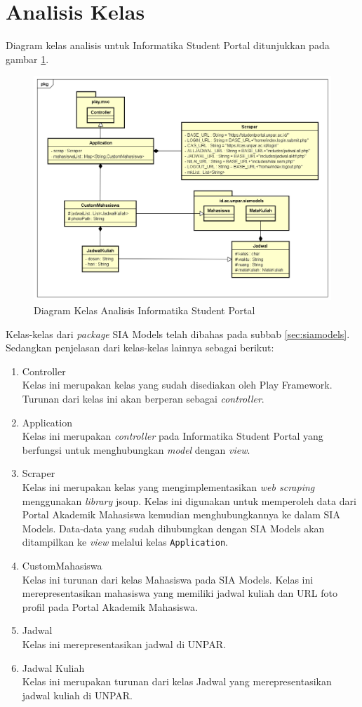\section{Analisis Kelas}
\label{sec:analisis_kelas}
Diagram kelas analisis untuk Informatika Student Portal ditunjukkan pada gambar \ref{fig:3_class_diagram}.
	\begin{figure}[H]
			\centering
			\includegraphics[scale=0.5]{Gambar/class-diagram}
			\caption{Diagram Kelas Analisis Informatika Student Portal} 
			\label{fig:3_class_diagram}
		\end{figure}
Kelas-kelas dari \textit{package} SIA Models telah dibahas pada subbab \ref{sec:siamodels}. Sedangkan penjelasan dari kelas-kelas lainnya sebagai berikut:
\begin{enumerate}
	\item Controller\\
	Kelas ini merupakan kelas yang sudah disediakan oleh Play Framework. Turunan dari kelas ini akan berperan sebagai \textit{controller}.
	\item Application\\
	Kelas ini merupakan \textit{controller} pada Informatika Student Portal yang berfungsi untuk menghubungkan \textit{model} dengan \textit{view}. 
	\item Scraper\\
	Kelas ini merupakan kelas yang mengimplementasikan \textit{web scraping} menggunakan \textit{library} jsoup. Kelas ini digunakan untuk memperoleh data dari Portal Akademik Mahasiswa kemudian menghubungkannya ke dalam SIA Models. Data-data yang sudah dihubungkan dengan SIA Models akan ditampilkan ke \textit{view} melalui kelas \texttt{Application}.
	\item CustomMahasiswa\\
	Kelas ini turunan dari kelas Mahasiswa pada SIA Models. Kelas ini merepresentasikan mahasiswa yang memiliki jadwal kuliah dan URL foto profil pada Portal Akademik Mahasiswa.
	\item Jadwal\\
	Kelas ini merepresentasikan jadwal di UNPAR.
	\item Jadwal Kuliah\\
	Kelas ini merupakan turunan dari kelas Jadwal yang merepresentasikan jadwal kuliah di UNPAR.
\end{enumerate}
		